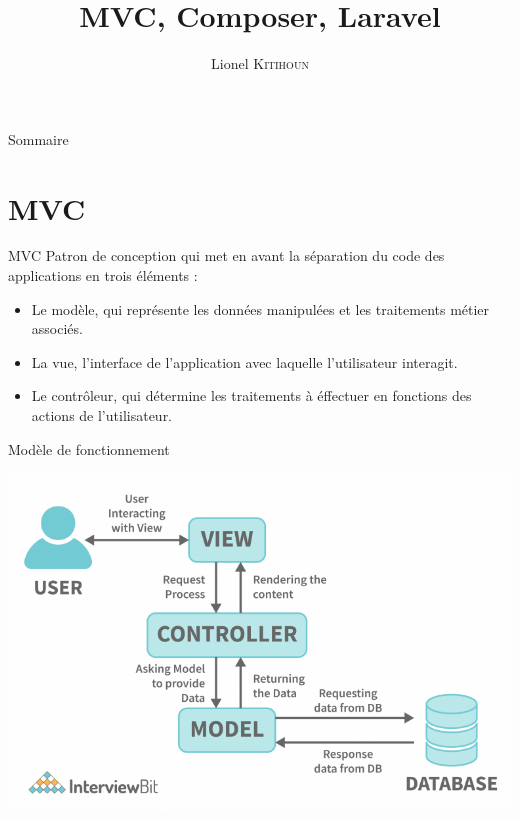 \documentclass{beamer}
\title{MVC, Composer, Laravel}
\date{}
\author{Lionel \textsc{Kitihoun}}
\begin{document}
\begin{frame}[plain]
\maketitle
\end{frame}

\begin{frame}{Sommaire}
\tableofcontents
\end{frame}

\section{MVC}
\begin{frame}{MVC}
  Patron de conception qui met en avant la séparation du code des applications en trois éléments :
  \begin{itemize}
    \item Le modèle, qui représente les données manipulées et les traitements métier associés.
    \item La vue, l'interface de l'application avec laquelle l'utilisateur interagit.
    \item Le contrôleur, qui détermine les traitements à éffectuer en fonctions des actions de l'utilisateur.
  \end{itemize}
\end{frame}

\begin{frame}{Modèle de fonctionnement}
  \begin{center}
    \includegraphics[scale=0.4]{images/working-of-mvc.png}
  \end{center}
\end{frame}
\end{document}
